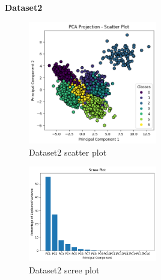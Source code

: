 \documentclass[12pt]{report}
\begin{document}
	\textbf{Dataset2}\\
	\begin{figure}[H]
		\centering
		\includegraphics[width=0.5\textwidth]{../PCA/OutputPlot/Dataset2/Dataset2scatterPlot.png}
		\caption{Dataset2 scatter plot}
		\label{Dataset2scatterPlot}
	\end{figure}
	\begin{figure}[H]
		\centering
		\includegraphics[width=0.5\textwidth]{../PCA/OutputPlot/Dataset2/Dataset2ScreePlot.png}
		\caption{Dataset2 scree plot}
		\label{Dataset2ScreePlot}
	\end{figure}

	\newpage
\end{document}

